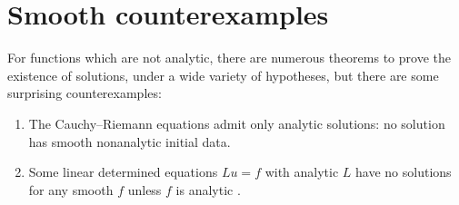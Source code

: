 \section{Smooth counterexamples}
For functions which are not analytic, there are numerous theorems to prove the existence of solutions, under a wide variety of hypotheses, but there are some surprising counterexamples:
\begin{enumerate}
\item
The Cauchy--Riemann equations admit only analytic solutions: no solution has smooth nonanalytic initial data.
\item
Some linear determined equations \(Lu=f\) with analytic \(L\) have no solutions for any smooth \(f\) unless \(f\) is analytic \cite{Lewy:1957}.
\end{enumerate}
